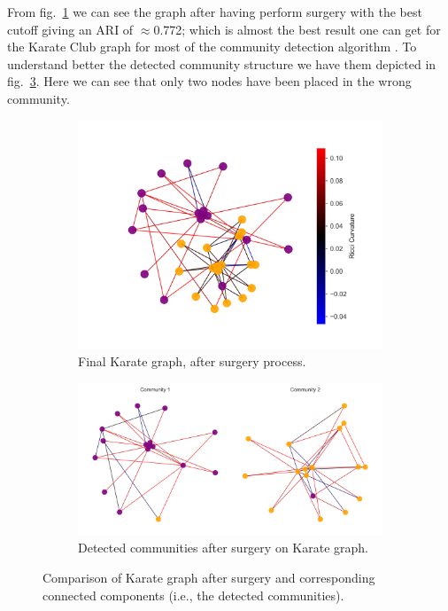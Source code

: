 From fig.~\ref{fig:Karate_Communities_a} we can see the graph after having perform surgery with the best cutoff giving an ARI of $\approx$0.772; which is almost the best result one can get for the Karate Club graph for most of the community detection algorithm \cite{Ni:communitydetectionnetworksricci}. To understand better the detected community structure we have them depicted in fig.~\ref{fig:Karate_Communities_b}. Here we can see that only two nodes have been placed in the wrong community.
\begin{figure}
    \centering
    \begin{subfigure}{0.45\textwidth}
        \centering
        \includegraphics[width=\textwidth]{../KarateClubResults/After Surgery.png}
        \caption{Final Karate graph, after surgery process.}
        \label{fig:Karate_Communities_a}
    \end{subfigure}
    \hfill
    \begin{subfigure}{0.45\textwidth}
        \centering
        \includegraphics[width=\textwidth]{../KarateClubResults/Detected Communities.png}
        \caption{Detected communities after surgery on Karate graph.}
        \label{fig:Karate_Communities_b}
    \end{subfigure}
    \caption{Comparison of Karate graph after surgery and corresponding connected components (i.e., the detected communities).}
\end{figure}

